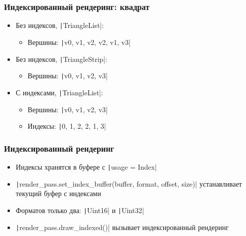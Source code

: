 \documentclass[10pt]{beamer}
\begin{document}
\begin{frame}[fragile]
\frametitle{Индексированный рендеринг: квадрат}
\begin{center}
\end{center}
\pause
\begin{itemize}
\item Без индексов, \texttt|TriangleList|:
\begin{itemize}
\item Вершины: \texttt|v0, v1, v2, v2, v1, v3|
\end{itemize}
\pause
\item Без индексов, \texttt|TriangleStrip|:
\begin{itemize}
\item Вершины: \texttt|v0, v1, v2, v3|
\end{itemize}
\pause
\item С индексами, \texttt|TriangleList|:
\begin{itemize}
\item Вершины: \texttt|v0, v1, v2, v3|
\item Индексы: \texttt|0, 1, 2, 2, 1, 3|
\end{itemize}
\end{itemize}
\end{frame}

\begin{frame}[fragile]
\frametitle{Индексированный рендеринг}
\begin{itemize}
\item Индексы хранятся в буфере с \texttt|usage = Index|
\pause
\item \texttt|render_pass.set_index_buffer(buffer, format, offset, size)| устанавливает текущий буфер с индексами
\pause
\item Форматов только два: \texttt|Uint16| и \texttt|Uint32|
\pause
\item \texttt|render_pass.draw_indexed()| вызывает индексированный рендеринг
\end{itemize}
\end{frame}
\end{document}
